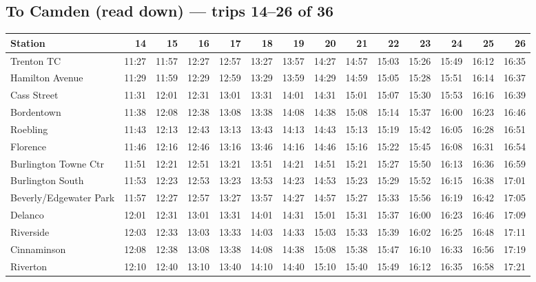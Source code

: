 \subsection*{To Camden (read down) --- trips 14--26 of 36}
\begin{center}\footnotesize\setlength{\tabcolsep}{3pt}\begin{tabular}{@{}lrrrrrrrrrrrrr@{}}\toprule
Station & 14 & 15 & 16 & 17 & 18 & 19 & 20 & 21 & 22 & 23 & 24 & 25 & 26 \\\midrule
Trenton TC & 11:27 & 11:57 & 12:27 & 12:57 & 13:27 & 13:57 & 14:27 & 14:57 & 15:03 & 15:26 & 15:49 & 16:12 & 16:35 \\
Hamilton Avenue & 11:29 & 11:59 & 12:29 & 12:59 & 13:29 & 13:59 & 14:29 & 14:59 & 15:05 & 15:28 & 15:51 & 16:14 & 16:37 \\
Cass Street & 11:31 & 12:01 & 12:31 & 13:01 & 13:31 & 14:01 & 14:31 & 15:01 & 15:07 & 15:30 & 15:53 & 16:16 & 16:39 \\
Bordentown & 11:38 & 12:08 & 12:38 & 13:08 & 13:38 & 14:08 & 14:38 & 15:08 & 15:14 & 15:37 & 16:00 & 16:23 & 16:46 \\
Roebling & 11:43 & 12:13 & 12:43 & 13:13 & 13:43 & 14:13 & 14:43 & 15:13 & 15:19 & 15:42 & 16:05 & 16:28 & 16:51 \\
Florence & 11:46 & 12:16 & 12:46 & 13:16 & 13:46 & 14:16 & 14:46 & 15:16 & 15:22 & 15:45 & 16:08 & 16:31 & 16:54 \\
Burlington Towne Ctr & 11:51 & 12:21 & 12:51 & 13:21 & 13:51 & 14:21 & 14:51 & 15:21 & 15:27 & 15:50 & 16:13 & 16:36 & 16:59 \\
Burlington South & 11:53 & 12:23 & 12:53 & 13:23 & 13:53 & 14:23 & 14:53 & 15:23 & 15:29 & 15:52 & 16:15 & 16:38 & 17:01 \\
Beverly/Edgewater Park & 11:57 & 12:27 & 12:57 & 13:27 & 13:57 & 14:27 & 14:57 & 15:27 & 15:33 & 15:56 & 16:19 & 16:42 & 17:05 \\
Delanco & 12:01 & 12:31 & 13:01 & 13:31 & 14:01 & 14:31 & 15:01 & 15:31 & 15:37 & 16:00 & 16:23 & 16:46 & 17:09 \\
Riverside & 12:03 & 12:33 & 13:03 & 13:33 & 14:03 & 14:33 & 15:03 & 15:33 & 15:39 & 16:02 & 16:25 & 16:48 & 17:11 \\
Cinnaminson & 12:08 & 12:38 & 13:08 & 13:38 & 14:08 & 14:38 & 15:08 & 15:38 & 15:47 & 16:10 & 16:33 & 16:56 & 17:19 \\
Riverton & 12:10 & 12:40 & 13:10 & 13:40 & 14:10 & 14:40 & 15:10 & 15:40 & 15:49 & 16:12 & 16:35 & 16:58 & 17:21 \\

\end{tabular}
\end{center}
